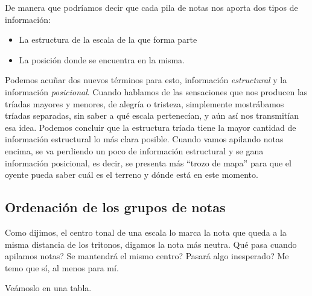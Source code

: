 \documentclass[]{report}
\providecommand{\tightlist}{%
  \setlength{\itemsep}{0pt}
  \setlength{\parskip}{0pt}
}
\begin{document}
De manera que podríamos decir que cada pila de notas nos aporta dos tipos de información:

\begin{itemize}
	\tightlist
	\item La estructura de la escala de la que forma parte
	\item La posición donde se encuentra en la misma.
\end{itemize}

Podemos acuñar dos nuevos términos para esto, información \emph{estructural} y la información \emph{posicional}. Cuando hablamos de las sensaciones que nos producen las tríadas mayores y menores, de alegría o tristeza, simplemente mostrábamos tríadas separadas, sin saber a qué escala pertenecían, y aún así nos transmitían esa idea. Podemos concluir que la estructura tríada tiene la mayor cantidad de información estructural lo más clara posible. Cuando vamos apilando notas encima, se va perdiendo un poco de información estructural y se gana información posicional, es decir, se presenta más ``trozo de mapa'' para que el oyente pueda saber cuál es el terreno y dónde está en este momento.

\subsection{Ordenación de los grupos de notas}

Como dijimos, el centro tonal de una escala lo marca la nota que queda a la misma distancia de los tritonos, digamos la nota más neutra. Qué pasa cuando apilamos notas? Se mantendrá el mismo centro? Pasará algo inesperado? Me temo que sí, al menos para mí.

Veámoslo en una tabla.

\end{document}
